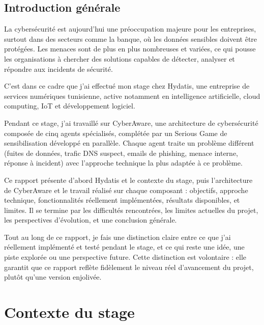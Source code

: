 \documentclass[12pt,a4paper]{report}
\begin{document}
\clearpage
{}

\chapter*{Introduction générale}

La cybersécurité est aujourd'hui une préoccupation majeure pour les entreprises, surtout dans des secteurs comme la banque, où les données sensibles doivent être protégées. Les menaces sont de plus en plus nombreuses et variées, ce qui pousse les organisations à chercher des solutions capables de détecter, analyser et répondre aux incidents de sécurité.

C'est dans ce cadre que j'ai effectué mon stage chez Hydatis, une entreprise de services numériques tunisienne, active notamment en intelligence artificielle, cloud computing, IoT et développement logiciel.

Pendant ce stage, j'ai travaillé sur CyberAware, une architecture de cybersécurité composée de cinq agents spécialisés, complétée par un Serious Game de sensibilisation développé en parallèle. Chaque agent traite un problème différent (fuites de données, trafic DNS suspect, emails de phishing, menace interne, réponse à incident) avec l'approche technique la plus adaptée à ce problème.

Ce rapport présente d'abord Hydatis et le contexte du stage, puis l'architecture de CyberAware et le travail réalisé sur chaque composant : objectifs, approche technique, fonctionnalités réellement implémentées, résultats disponibles, et limites. Il se termine par les difficultés rencontrées, les limites actuelles du projet, les perspectives d'évolution, et une conclusion générale.

Tout au long de ce rapport, je fais une distinction claire entre ce que j'ai réellement implémenté et testé pendant le stage, et ce qui reste une idée, une piste explorée ou une perspective future. Cette distinction est volontaire : elle garantit que ce rapport reflète fidèlement le niveau réel d'avancement du projet, plutôt qu'une version enjolivée.

\part{Contexte du stage}
\end{document}
